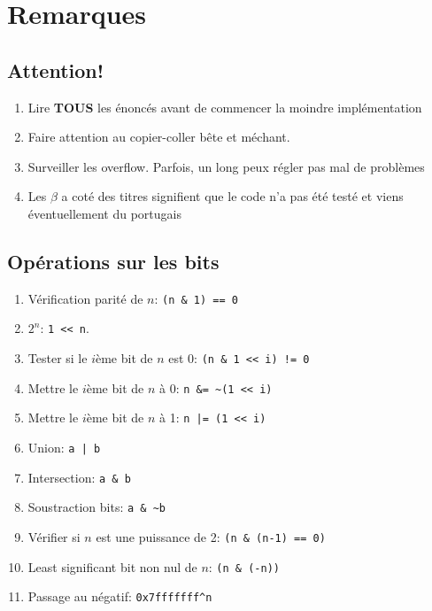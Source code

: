 \section{Remarques}
\subsection{Attention!}
\begin{enumerate}
	\item Lire \textbf{TOUS} les énoncés avant de commencer la moindre implémentation
	\item Faire attention au copier-coller bête et méchant.
	\item Surveiller les overflow. Parfois, un long peux régler pas mal de problèmes
	\item Les $\beta$ a coté des titres signifient que le code n'a pas été testé et viens éventuellement du portugais
\end{enumerate}
 
\subsection{Opérations sur les bits}
\begin{enumerate}
	\item Vérification parité de $n$: \lstinline{(n & 1) == 0}
	\item $2^n$: \lstinline|1 << n|.
	\item Tester si le $i$ème bit de $n$ est $0$: \lstinline{(n & 1 << i) != 0}
	\item Mettre le $i$ème bit de $n$ à 0: \lstinline{n &= ~(1 << i)}
	\item Mettre le $i$ème bit de $n$ à 1: \lstinline{n |= (1 << i)}
	\item Union: \lstinline{a | b}
	\item Intersection: \lstinline{a & b}
	\item Soustraction bits: \lstinline{a & ~b}
	\item Vérifier si $n$ est une puissance de 2: \lstinline{(n & (n-1) == 0)}
	\item Least significant bit non nul de $n$: \lstinline{(n & (-n))}
	\item Passage au négatif: \lstinline{0x7fffffff^n}
\end{enumerate}
